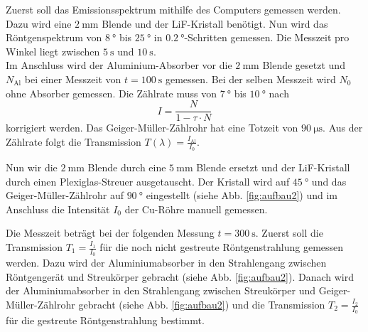 Zuerst soll das Emissionsspektrum mithilfe des Computers gemessen werden.
Dazu wird eine $\SI{2}{\milli\metre}$ Blende und der LiF-Kristall benötigt.
Nun wird das Röntgenspektrum von $\SI{8}{\degree}$ bis $\SI{25}{\degree}$ in $\SI{0.2}{\degree}$-Schritten gemessen.
Die Messzeit pro Winkel liegt zwischen $\SI{5}{\second}$ und $\SI{10}{\second}$.
\\
Im Anschluss wird der Aluminium-Absorber vor die $\SI{2}{\milli\metre}$ Blende gesetzt und $N_\text{Al}$ bei einer Messzeit von $t=\SI{100}{\second}$ gemessen.
Bei der selben Messzeit wird $N_0$ ohne Absorber gemessen.
Die Zählrate muss von $\SI{7}{\degree}$ bis $\SI{10}{\degree}$ nach
\begin{equation}
    I = \frac{N}{1 - \tau \cdot N}
    \label{eqn:totzeit}
\end{equation}
korrigiert werden.
Das Geiger-Müller-Zählrohr hat eine Totzeit von $\SI{90}{\micro\second}$.
Aus der Zählrate folgt die Transmission $T(\lambda) = \frac{I_\text{Al}}{I_0}$.

Nun wir die $\SI{2}{\milli\metre}$ Blende durch eine $\SI{5}{\milli\metre}$ Blende ersetzt und der LiF-Kristall durch einen Plexiglas-Streuer ausgetauscht.
Der Kristall wird auf $\SI{45}{\degree}$ und das Geiger-Müller-Zählrohr auf $\SI{90}{\degree}$ eingestellt (siehe Abb. \ref{fig:aufbau2}) und im Anschluss die Intensität $I_0$ der Cu-Röhre manuell gemessen.

Die Messzeit beträgt bei der folgenden Messung $t=\SI{300}{\second}$.
Zuerst soll die Transmission $T_1=\frac{I_1}{I_0}$ für die noch nicht gestreute Röntgenstrahlung gemessen werden.
Dazu wird der Aluminiumabsorber in den Strahlengang zwischen Röntgengerät und Streukörper gebracht (siehe Abb. \ref{fig:aufbau2}).
Danach wird der Aluminiumabsorber in den Strahlengang zwischen Streukörper und Geiger-Müller-Zählrohr gebracht (siehe Abb. \ref{fig:aufbau2}) und die Transmission $T_2=\frac{I_2}{I_0}$ für die gestreute Röntgenstrahlung bestimmt.
